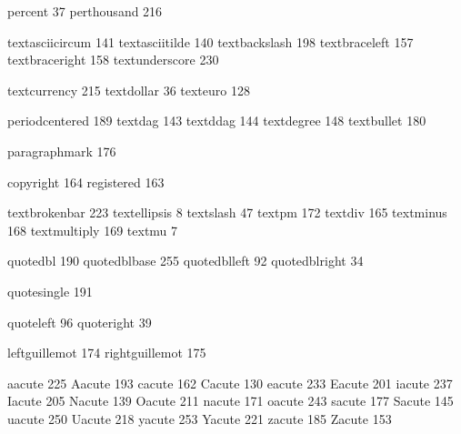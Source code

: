  percent           37
 perthousand      216

 textasciicircum  141
 textasciitilde   140
 textbackslash    198
 textbraceleft    157
 textbraceright   158
 textunderscore   230

 textcurrency     215
 textdollar        36
 texteuro         128

 periodcentered   189
 textdag          143
 textddag         144
 textdegree       148
 textbullet       180

 paragraphmark    176

 copyright        164
 registered       163

 textbrokenbar    223
 textellipsis       8
 textslash         47
 textpm           172
 textdiv          165
 textminus        168
 textmultiply     169
 textmu             7

 quotedbl         190
 quotedblbase     255
 quotedblleft      92
 quotedblright     34

 quotesingle      191

 quoteleft         96
 quoteright        39

 leftguillemot    174
 rightguillemot   175

 aacute           225
 Aacute           193
 cacute           162
 Cacute           130
 eacute           233
 Eacute           201
 iacute           237
 Iacute           205
 Nacute           139
 Oacute           211
 nacute           171
 oacute           243
 sacute           177
 Sacute           145
 uacute           250
 Uacute           218
 yacute           253
 Yacute           221
 zacute           185
 Zacute           153

